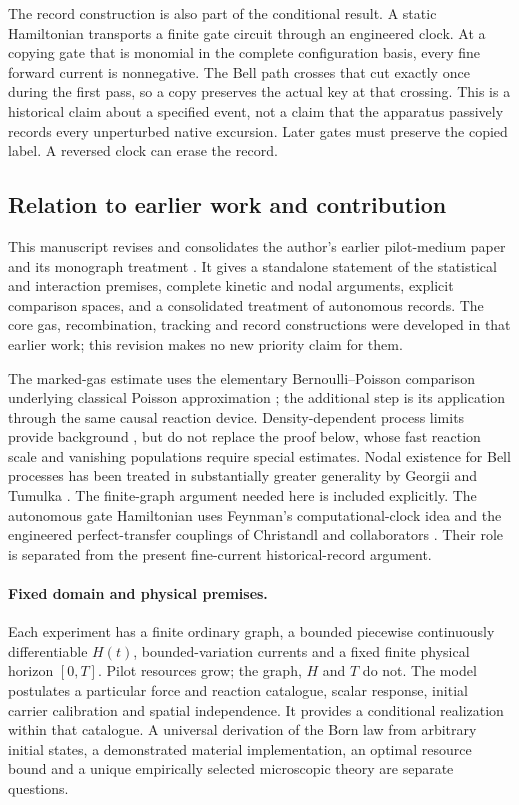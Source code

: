 \documentclass[11pt]{article}
\theoremstyle{definition}\newtheorem{definition}[theorem]{Definition}
\theoremstyle{remark}\newtheorem{remark}[theorem]{Remark}
\begin{document}
The record construction is also part of the conditional result. A static Hamiltonian transports a finite gate circuit through an engineered clock. At a copying gate that is monomial in the complete configuration basis, every fine forward current is nonnegative. The Bell path crosses that cut exactly once during the first pass, so a copy preserves the actual key at that crossing. This is a historical claim about a specified event, not a claim that the apparatus passively records every unperturbed native excursion. Later gates must preserve the copied label. A reversed clock can erase the record.

\subsection{Relation to earlier work and contribution}
This manuscript revises and consolidates the author's earlier pilot-medium paper \cite{PilotPrior} and its monograph treatment \cite{Monograph}. It gives a standalone statement of the statistical and interaction premises, complete kinetic and nodal arguments, explicit comparison spaces, and a consolidated treatment of autonomous records. The core gas, recombination, tracking and record constructions were developed in that earlier work; this revision makes no new priority claim for them.

The marked-gas estimate uses the elementary Bernoulli--Poisson comparison underlying classical Poisson approximation \cite{LeCam1960}; the additional step is its application through the same causal reaction device. Density-dependent process limits provide background \cite{Kurtz1970}, but do not replace the proof below, whose fast reaction scale and vanishing populations require special estimates. Nodal existence for Bell processes has been treated in substantially greater generality by Georgii and Tumulka \cite{GeorgiiTumulka2005}. The finite-graph argument needed here is included explicitly. The autonomous gate Hamiltonian uses Feynman's computational-clock idea \cite{Feynman1986} and the engineered perfect-transfer couplings of Christandl and collaborators \cite{Christandl2004}. Their role is separated from the present fine-current historical-record argument.

\paragraph{Fixed domain and physical premises.}
Each experiment has a finite ordinary graph, a bounded piecewise continuously differentiable $H(t)$, bounded-variation currents and a fixed finite physical horizon $[0,T]$. Pilot resources grow; the graph, $H$ and $T$ do not. The model postulates a particular force and reaction catalogue, scalar response, initial carrier calibration and spatial independence. It provides a conditional realization within that catalogue. A universal derivation of the Born law from arbitrary initial states, a demonstrated material implementation, an optimal resource bound and a unique empirically selected microscopic theory are separate questions.
\end{document}
